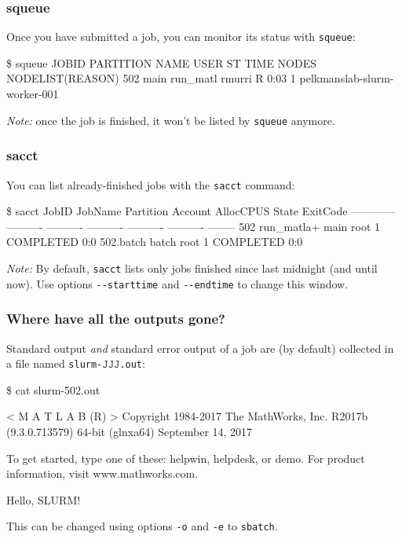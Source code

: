 \documentclass[english,serif,mathserif,usenames,dvipsnames]{beamer}
\begin{document}
\begin{frame}[fragile]
  \frametitle{squeue}
  Once you have submitted a job, you can monitor its status with \texttt{squeue}:

\begin{semiverbatim}\tiny
\$ squeue
JOBID PARTITION     NAME     USER ST       TIME  NODES NODELIST(REASON)
  502      main run_matl   rmurri  R       0:03      1 pelkmanslab-slurm-worker-001
\end{semiverbatim}

  \+
  \emph{Note:} once the job is finished, it won't be listed by
  \texttt{squeue} anymore.

\end{frame}


\begin{frame}[fragile]
  \frametitle{sacct}

  \+
  You can list already-finished jobs with the \texttt{sacct} command:

\begin{semiverbatim}\tiny
\$ sacct
       JobID    JobName  Partition    Account  AllocCPUS      State ExitCode
------------ ---------- ---------- ---------- ---------- ---------- --------
502          run_matla+       main       root          1  COMPLETED      0:0
502.batch         batch                  root          1  COMPLETED      0:0
\end{semiverbatim}

  \+ \emph{Note:} By default, \texttt{sacct} lists only jobs finished
  since last midnight (and until now).  Use options
  \texttt{-{}-starttime} and \texttt{-{}-endtime} to change this
  window.
\end{frame}


\begin{frame}[fragile]
  \frametitle{Where have all the outputs gone?}

  Standard output \emph{and} standard error output of a job are (by
  default) collected in a file named
  \texttt{slurm-}$\mathtt{JJJ}$\texttt{.out}:

  \begin{semiverbatim}\tiny
\$ cat slurm-502.out

                            < M A T L A B (R) >
                  Copyright 1984-2017 The MathWorks, Inc.
                   R2017b (9.3.0.713579) 64-bit (glnxa64)
                             September 14, 2017


To get started, type one of these: helpwin, helpdesk, or demo.
For product information, visit www.mathworks.com.

Hello, SLURM!
\end{semiverbatim}

\+
  This can be changed using options \texttt{-o} and \texttt{-e} to \texttt{sbatch}.
\end{frame}
\end{document}
